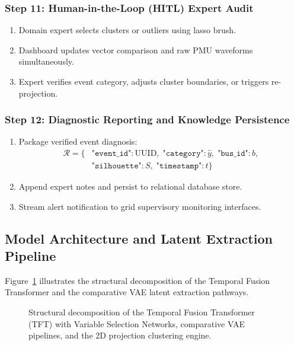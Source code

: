 \documentclass[12pt,a4paper]{report}
\begin{document}
\subsubsection*{Step 11: Human-in-the-Loop (HITL) Expert Audit}
\begin{enumerate}
  \item[\textbf{11.1}] Domain expert selects clusters or outliers using lasso brush.
  \item[\textbf{11.2}] Dashboard updates vector comparison and raw PMU waveforms simultaneously.
  \item[\textbf{11.3}] Expert verifies event category, adjusts cluster boundaries, or triggers re-projection.
\end{enumerate}

\subsubsection*{Step 12: Diagnostic Reporting and Knowledge Persistence}
\begin{enumerate}
  \item[\textbf{12.1}] Package verified event diagnosis:
    \begin{equation}
      \begin{aligned}
        \mathcal{R} = \{ & \texttt{"event\_id"}: \text{UUID}, \;\texttt{"category"}: \hat{y}, \;\texttt{"bus\_id"}: b, \\
                         & \texttt{"silhouette"}: S, \;\texttt{"timestamp"}: t \}
      \end{aligned}
    \end{equation}
  \item[\textbf{12.2}] Append expert notes and persist to relational database store.
  \item[\textbf{12.3}] Stream alert notification to grid supervisory monitoring interfaces.
\end{enumerate}

\subsection{Model Architecture and Latent Extraction Pipeline}
Figure~\ref{fig:dag_scheduling_walkthrough} illustrates the structural decomposition of the Temporal Fusion Transformer and the comparative VAE latent extraction pathways.

\begin{figure}[H]
    \centering
    \caption{Structural decomposition of the Temporal Fusion Transformer (TFT) with Variable Selection Networks, comparative VAE pipelines, and the 2D projection clustering engine.}
    \label{fig:dag_scheduling_walkthrough}
\end{figure}
\end{document}
